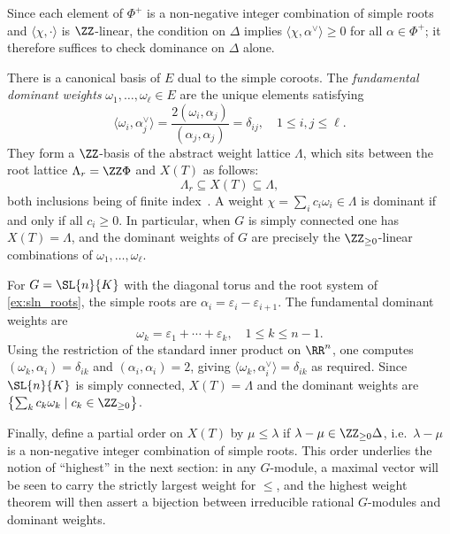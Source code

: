 Since each element of $\Phi^+$ is a non-negative integer combination of simple roots
and $\langle \chi, \cdot \rangle$ is $\ZZ$-linear, the condition on $\Delta$ implies
$\langle \chi, \alpha^\vee \rangle \geq 0$ for all $\alpha \in \Phi^+$; it therefore
suffices to check dominance on $\Delta$ alone.

There is a canonical basis of $E$ dual to the simple coroots. The
\emph{fundamental dominant weights} $\omega_1, \ldots, \omega_\ell \in E$ are the
unique elements satisfying
\[
    \langle \omega_i, \alpha_j^\vee \rangle
    = \frac{2(\omega_i, \alpha_j)}{(\alpha_j, \alpha_j)} = \delta_{ij},
    \quad 1 \leq i, j \leq \ell.
\]
They form a $\ZZ$-basis of the abstract weight lattice $\Lambda$, which sits between
the root lattice $\Lambda_r = \ZZ\Phi$ and $X(T)$ as follows:
\[
    \Lambda_r \subseteq X(T) \subseteq \Lambda,
\]
both inclusions being of finite index~\cite[Section~31.2]{humphreys_linear_1975}.
A weight $\chi = \sum_i c_i \omega_i \in \Lambda$ is dominant if and only if all
$c_i \geq 0$. In particular, when $G$ is simply connected one has $X(T) = \Lambda$,
and the dominant weights of $G$ are precisely the $\ZZ_{\geq 0}$-linear combinations
of $\omega_1, \ldots, \omega_\ell$.
\begin{exmp}
    For $G = \SL{n}{K}$ with the diagonal torus and the root system
    of \cref{ex:sln_roots}, the simple roots are $\alpha_i = \varepsilon_i - \varepsilon_{i+1}$.
    The fundamental dominant weights are
    \[
        \omega_k = \varepsilon_1 + \cdots + \varepsilon_k, \quad 1 \leq k \leq n-1.
    \]
    Using the restriction of the standard inner product on $\RR^n$, one computes
    $(\omega_k, \alpha_i) = \delta_{ik}$ and $(\alpha_i, \alpha_i) = 2$, giving
    $\langle \omega_k, \alpha_i^\vee \rangle = \delta_{ik}$ as required. Since
    $\SL{n}{K}$ is simply connected, $X(T) = \Lambda$ and the dominant weights
    are $\bigl\{\sum_k c_k \omega_k \mid c_k \in \ZZ_{\geq 0}\bigr\}$.
\end{exmp}

Finally, define a partial order on $X(T)$ by $\mu \leq \lambda$ if
$\lambda - \mu \in \ZZ_{\geq 0}\Delta$, i.e.\ $\lambda - \mu$ is a non-negative
integer combination of simple roots. This order underlies the notion of
``highest'' in the next section: in any $G$-module, a maximal vector will be seen
to carry the strictly largest weight for $\leq$, and the highest weight theorem will
then assert a bijection between irreducible rational $G$-modules and dominant weights.

